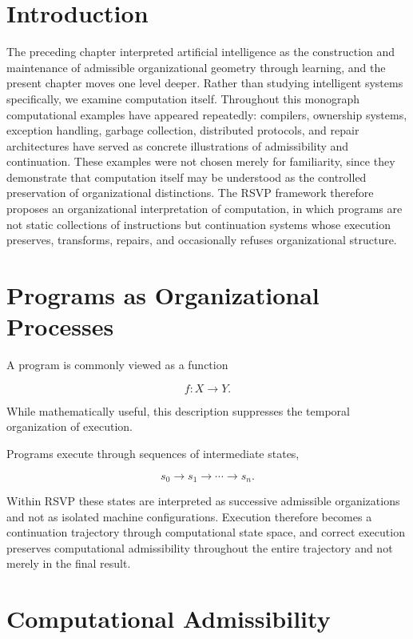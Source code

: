 \documentclass[11pt,oneside]{book}
\numberwithin{equation}{chapter}
\theoremstyle{definition}
\theoremstyle{plain}
\begin{document}
\section{Introduction}

The preceding chapter interpreted artificial intelligence as the construction and maintenance of admissible organizational geometry through learning, and the present chapter moves one level deeper. Rather than studying intelligent systems specifically, we examine computation itself. Throughout this monograph computational examples have appeared repeatedly: compilers, ownership systems, exception handling, garbage collection, distributed protocols, and repair architectures have served as concrete illustrations of admissibility and continuation. These examples were not chosen merely for familiarity, since they demonstrate that computation itself may be understood as the controlled preservation of organizational distinctions. The RSVP framework therefore proposes an organizational interpretation of computation, in which programs are not static collections of instructions but continuation systems whose execution preserves, transforms, repairs, and occasionally refuses organizational structure.

\section{Programs as Organizational Processes}

A program is commonly viewed as a function

\[
f:X\rightarrow Y.
\]

While mathematically useful, this description suppresses the temporal
organization of execution.

Programs execute through sequences of intermediate states,

\[
s_0
\rightarrow
s_1
\rightarrow
\cdots
\rightarrow
s_n.
\]

Within RSVP these states are interpreted as successive admissible organizations and not as isolated machine configurations. Execution therefore becomes a continuation trajectory through computational state space, and correct execution preserves computational admissibility throughout the entire trajectory and not merely in the final result.

\section{Computational Admissibility}
\end{document}

